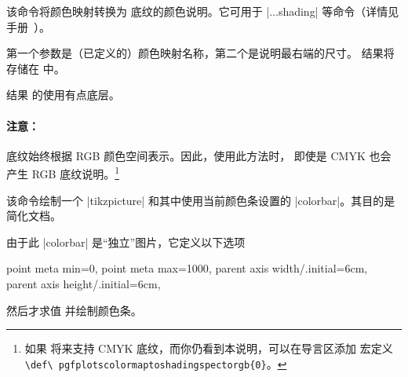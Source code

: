 \begin{command}{\pgfplotscolormaptoshadingspec{}}
    该命令将颜色映射转换为 \PGF{} 底纹的颜色说明。它可用于
    |\pgfdeclare...shading| 等命令（详情见 \PGF{} 手册~\cite{tikz}）。

    第一个参数是（已定义的）颜色映射名称，第二个是说明最右端的尺寸。
    结果将存储在  中。
\begin{codeexample}[]
    \result
    \def\tempb{\pgfdeclarehorizontalshading{tempshading}{1cm}}%
    \expandafter\tempb\expandafter{\result}%
\end{codeexample}
    结果  的使用有点底层。


    \paragraph{注意：}

    \PGF{} 底纹始终根据 RGB 颜色空间表示。因此，使用此方法时，
    即使是 CMYK  也会产生 RGB 底纹说明。\footnote{
    如果 \PGF{} 将来支持 CMYK 底纹，而你仍看到本说明，可以在导言区添加
    宏定义 \texttt{\textbackslash def\textbackslash
    pgfplotscolormaptoshadingspectorgb\{0\}}。}
\end{command}

\begin{command}{\pgfplotscolorbardrawstandalone{}}
    该命令绘制一个 |tikzpicture| 和其中使用当前颜色条设置的
    |colorbar|。其目的是简化文档。

    由于此 |colorbar| 是``独立''图片，它定义以下选项
\begin{codeexample}
    point meta min=0,
    point meta max=1000,
    parent axis width/.initial=6cm,
    parent axis height/.initial=6cm,
\end{codeexample}
    然后才求值  并绘制颜色条。
\end{command}

